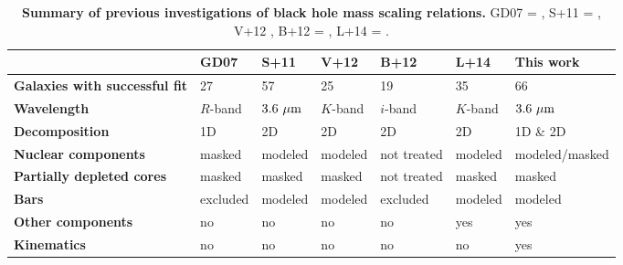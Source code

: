 \documentclass[preprint2]{emulateapj}
\begin{document}
\begin{table}%
\begin{center}  				      
\caption{{\bf Summary of previous investigations of black hole mass scaling relations.} 
GD07 = \cite{grahamdriver2007}, 
S+11 = \cite{sani2011}, V+12 \cite{vika2012}, B+12 = \cite{beifiori2012}, L+14 = \cite{lasker2014data}.}
\begin{tabular}{lllllll}
\hline
              & {\bf GD07}  & {\bf S+11}   & {\bf V+12} & {\bf B+12}   & {\bf L+14} & {\bf This work}	      \\ %
\hline
{\bf Galaxies with successful fit} & 27		     & 57	       & 25      & 19          & 35      & 66               \\
{\bf Wavelength}        	   & $R$-band	     & $3.6~\rm \mu m$ & $K$-band& $i$-band    & $K$-band& $3.6~\rm \mu m$  \\
{\bf Decomposition}     	   & 1D 	     & 2D	       & 2D	 & 2D	       & 2D	 & 1D \& 2D	    \\
{\bf Nuclear components}       	   & masked	     & modeled         & modeled & not treated & modeled & modeled/masked   \\
{\bf Partially depleted cores} 	   & masked	     & masked	       & masked  & not treated & masked  & masked	    \\ 
{\bf Bars}	        	   & excluded	     & modeled         & modeled & excluded    & modeled & modeled	    \\ 
{\bf Other components}  	   & no 	  & no  	       & no	 & no	       & yes	 & yes  	    \\ 
{\bf Kinematics}        	   & no 	     & no	       & no	 & no	       & no	 & yes  	    \\ %
\hline 
\end{tabular}
\label{tab:lit} 
\end{center}	
\end{table}
\end{document}
